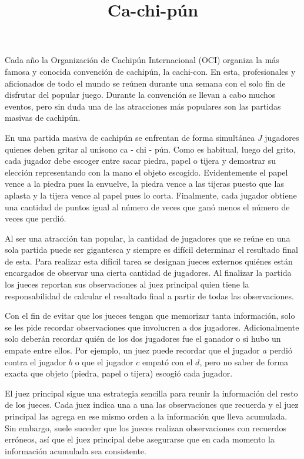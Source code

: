 \documentclass{oci}
\title{Ca-chi-pún}
\begin{document}
\begin{problemDescription}
  Cada año la Organización de Cachipún Internacional (OCI) organiza la
  más famosa y conocida convención de cachipún, la cachi-con.
  En esta, profesionales y aficionados de todo el mundo se reúnen durante una
  semana con el solo fin de disfrutar del popular juego.
  Durante la convención se llevan a cabo muchos eventos, pero sin duda una de
  las atracciones más populares son las partidas masivas de cachipún.

  En una partida masiva de cachipún se enfrentan de forma simultánea $J$
  jugadores quienes deben gritar al unísono ca - chi - pún.
  Como es habitual, luego del grito, cada jugador debe escoger entre sacar
  piedra, papel o tijera y demostrar su elección representando con la mano
  el objeto escogido.
  Evidentemente el papel vence a la piedra pues la envuelve, la piedra vence a
  las tijeras puesto que las aplasta y la tijera vence al papel pues lo corta.
  Finalmente, cada jugador obtiene una cantidad de puntos igual al número de
  veces que ganó menos el número de veces que perdió.

  Al ser una atracción tan popular, la cantidad de jugadores que se reúne en una
  sola partida puede ser gigantesca y siempre es difícil determinar el
  resultado final de esta.
  Para realizar esta difícil tarea se designan jueces externos quiénes
  están encargados de observar una cierta cantidad de jugadores.
  Al finalizar la partida los jueces reportan sus observaciones al juez
  principal quien tiene la responsabilidad de calcular el resultado final a
  partir de todas las observaciones.

  Con el fin de evitar que los jueces tengan que memorizar tanta información,
  solo se les pide recordar observaciones que involucren a dos jugadores.
  Adicionalmente solo deberán recordar quién de los dos jugadores fue el ganador
  o si hubo un empate entre ellos.
  Por ejemplo, un juez puede recordar que el jugador $a$ perdió contra el
  jugador $b$ o que el jugador $c$ empató con el $d$, pero no saber de forma
  exacta que objeto (piedra, papel o tijera) escogió cada jugador.

  El juez principal sigue una estrategia sencilla para reunir la información del
  resto de los jueces.
  Cada juez indica una a una las observaciones que recuerda y el juez principal
  las agrega en ese mismo orden a la información que lleva acumulada.
  Sin embargo, suele suceder que los jueces realizan observaciones con recuerdos
  erróneos, así que el juez principal debe asegurarse que en cada momento la
  información acumulada sea consistente.


\end{problemDescription}
\end{document}
